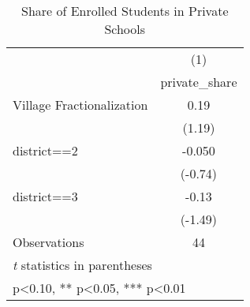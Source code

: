 \begin{table}[htbp]\centering
\def\sym#1{\ifmmode^{#1}\else\(^{#1}\)\fi}
\caption{Share of Enrolled Students in Private Schools \label{privateshare}}
\begin{tabular}{l*{1}{c}}
\toprule
                &\multicolumn{1}{c}{(1)}\\
                &\multicolumn{1}{c}{private\_share}\\
\midrule
Village Fractionalization&     0.19   \\
                &   (1.19)   \\
district==2     &   -0.050   \\
                &  (-0.74)   \\
district==3     &    -0.13   \\
                &  (-1.49)   \\
\midrule
Observations    &       44   \\
\bottomrule
\multicolumn{2}{l}{\footnotesize \textit{t} statistics in parentheses}\\
\multicolumn{2}{l}{\footnotesize * p<0.10, ** p<0.05, *** p<0.01}\\
\end{tabular}
\end{table}
